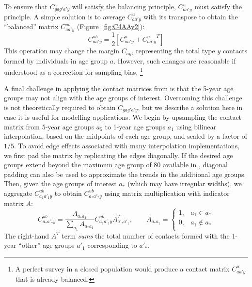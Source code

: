 To ensure that $C_{gag'a'y}$ will satisfy the balancing principle,
$C^u_{aa'y}$ must satisfy the principle.
A simple solution is to average $C^u_{aa'y}$ with its transpose
to obtain the ``balanced'' matrix $C^{ub}_{aa'y}$ (Figure~\ref{fig:C4AAy2}):
\begin{equation}\label{eq:C^ub}
  C^{ub}_{aa'y} = \frac{1}{2}\left[C^u_{aa'y} + {C^u_{aa'y}}^{T}\right]
\end{equation}
This operation may change the margin $C_{ay}$, representing
the total type $y$ contacts formed by individuals in age group $a$.
However, such changes are reasonable if understood as a correction for sampling bias.%
\footnote{A perfect survey in a closed population would produce
  a contact matrix $C^u_{aa'y}$ that is already balanced.}
\par
A final challenge in applying the contact matrices from \cite{Prem2017} is that
the 5-year age groups may not align with the age groups of interest.
Overcoming this challenge is not theoretically required to obtain $C_{gag'a'y}$,
but we describe a solution here in case it is useful for modelling applications.
We begin by upsampling the contact matrix from 5-year age groups $a_5$ to 1-year age groups $a_1$
using bilinear interpolation, based on the midpoints of each age group,
and scaled by a factor of $1/5$.
To avoid edge effects associated with many interpolation implementations,
we first pad the matrix by replicating the edges diagonally.
If the desired age groups extend beyond the maximum age group of 80 available in \cite{Arenas2020},
diagonal padding can also be used to approximate the trends in the additional age groups.
Then, given the age groups of interest $a_*$ (which may have irregular widths),
we aggregate $C^{ub}_{a_1a'_1y}$ to obtain $C^{ub}_{a_*a'_*y}$
using matrix multiplication with indicator matrix $A$:
\begin{equation}\label{eq:Ca*}
  C^{ub}_{a_*a'_*y} = \frac{A_{a_*a_1}}{\sum_{a_1} A_{a_*a_1}} C^{ub}_{a_1a'_1y} A_{a'_*a'_1}^T,\qquad
  A_{a_*a_1} = \begin{cases}
    1, & a_1 \in a_* \\
    0, & a_1 \not\in a_* \\
  \end{cases}
\end{equation}
The right-hand $A^T$ term \textit{sums} the total number of contacts
formed with the 1-year ``other'' age groups $a'_1$ corresponding to $a'_*$.
